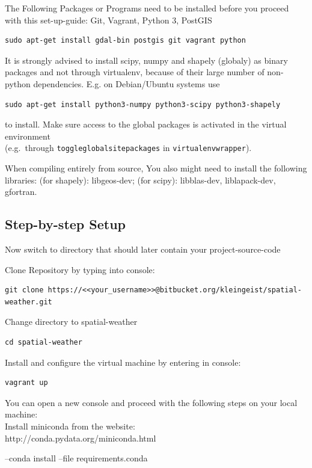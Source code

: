 \documentclass[paper=a4, fontsize=11pt]{scrartcl} %
\numberwithin{equation}{section} %
\numberwithin{figure}{section} %
\numberwithin{table}{section} %
\begin{document}
The Following Packages or Programs need to be installed before you proceed with this set-up-guide: Git, Vagrant, Python 3, PostGIS

\begin{lstlisting}
sudo apt-get install gdal-bin postgis git vagrant python
\end{lstlisting}

It is strongly advised to install scipy, numpy and shapely (globaly) as
binary packages and not through virtualenv, because of their large
number of non-python dependencies. E.g. on Debian/Ubuntu systems use
\begin{lstlisting}
sudo apt-get install python3-numpy python3-scipy python3-shapely
\end{lstlisting}
to install. Make sure access to the global packages is activated in the
virtual environment\\(e.g.~through \texttt{toggleglobalsitepackages} in
\texttt{virtualenvwrapper}).

When compiling entirely from source, You also might need to install the
following libraries: (for shapely): libgeos-dev; (for scipy):
libblas-dev, liblapack-dev, gfortran.

\subsection{Step-by-step Setup}
Now switch to directory that should later contain your project-source-code

Clone Repository by typing into console:
\begin{lstlisting}
git clone https://<<your_username>>@bitbucket.org/kleingeist/spatial-weather.git
\end{lstlisting}

Change directory to spatial-weather
\begin{lstlisting}
cd spatial-weather
\end{lstlisting}

Install and configure the virtual machine by entering in console:
\begin{lstlisting}
vagrant up
\end{lstlisting}

You can open a new console and proceed with the following steps on your local machine:\\
Install miniconda from the website:\\
http://conda.pydata.org/miniconda.html

--conda install --file requirements.conda
\end{document}

